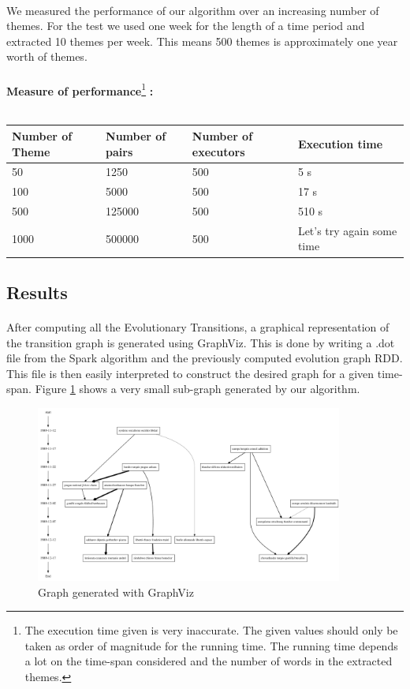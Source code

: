 \paragraph{}
We measured the performance of our algorithm over an increasing number of themes. For the test we used one week for the length of a time period and extracted 10 themes per week. This means 500 themes is approximately one year worth of themes.

\paragraph{}
\textbf{Measure of performance}\footnote{The execution time given is very inaccurate. The given values should only be taken as order of magnitude for the running time. The running time depends a lot on the time-span considered and the number of words in the extracted themes.}\textbf{ :}~\\
~\newline
\begin{tabular}{l|l|l|l}
\label{tab:quadratic}
Number of Theme & Number of pairs & Number of executors & Execution time \\ \hline
50 & 1250 & 500 & 5 s \\
100 & 5000 & 500 & 17 s \\
500 & 125000 & 500 & 510 s \\
1000 & 500000 & 500 & Let's try again some time \\
\end{tabular}

\subsection{Results}
\label{sec:EvoGraphResults}

\paragraph{}
After computing all the Evolutionary Transitions, a graphical representation of the transition graph is generated using GraphViz. This is done by writing a .dot file from the Spark algorithm and the previously computed evolution graph RDD. This file is then easily interpreted to construct the desired graph for a given time-span. Figure \ref{fig:graph} shows a very small sub-graph generated by our algorithm. 

\begin{figure}[H]
\begin{center}
\includegraphics[width=0.9\textwidth]{images/graph.png}
\caption{Graph generated with GraphViz}
\label{fig:graph}
\end{center}
\end{figure}
